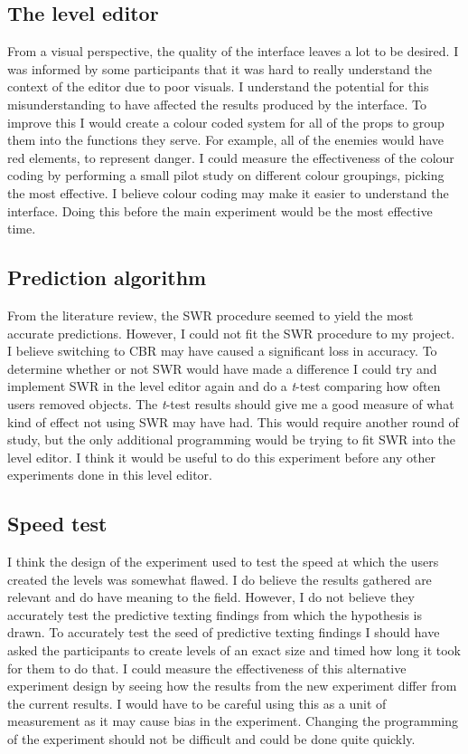 \documentclass[journal]{IEEEtran}
\begin{document}
\subsection{The level editor}
From a visual perspective, the quality of the interface leaves a lot to be desired. I was informed by some participants that it was hard to really understand the context of the editor due to poor visuals. I understand the potential for this misunderstanding to have affected the results produced by the interface. To improve this I would create a colour coded system for all of the props to group them into the functions they serve. For example, all of the enemies would have red elements, to represent danger. I could measure the effectiveness of the colour coding by performing a small pilot study on different colour groupings, picking the most effective. I believe colour coding may make it easier to understand the interface. Doing this before the main experiment would be the most effective time. 

\subsection{Prediction algorithm}
From the literature review, the SWR procedure seemed to yield the most accurate predictions. However, I could not fit the SWR procedure to my project. I believe switching to CBR may have caused a significant loss in accuracy. To determine whether or not SWR would have made a difference I could try and implement SWR in the level editor again and do a \textit{t}-test comparing how often users removed objects. The \textit{t}-test results should give me a good measure of what kind of effect not using SWR may have had. This would require another round of study, but the only additional programming would be trying to fit SWR into the level editor. I think it would be useful to do this experiment before any other experiments done in this level editor.

\subsection{Speed test}
I think the design of the experiment used to test the speed at which the users created the levels was somewhat flawed. I do believe the results gathered are relevant and do have meaning to the field. However,  I do not believe they accurately test the predictive texting findings from which the hypothesis is drawn. To accurately test the seed of predictive texting findings I should have asked the participants to create levels of an exact size and timed how long it took for them to do that. I could measure the effectiveness of this alternative experiment design by seeing how the results from the new experiment differ from the current results. I would have to be careful using this as a unit of measurement as it may cause bias in the experiment. Changing the programming of the experiment should not be difficult and could be done quite quickly.
\end{document}

